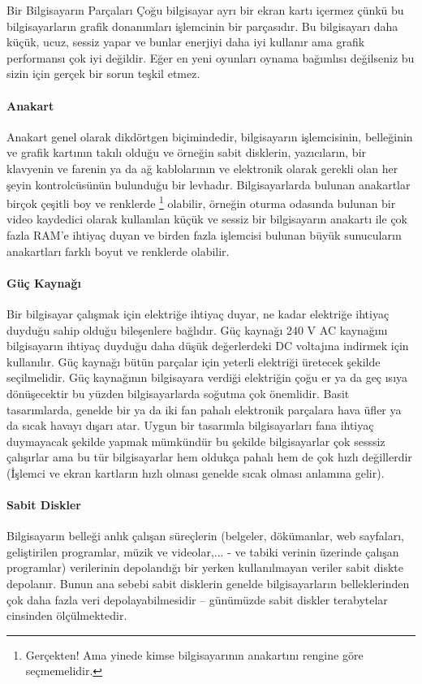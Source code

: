 \begin{section}{Bir Bilgisayarın Parçaları}
Çoğu bilgisayar ayrı bir ekran kartı içermez çünkü bu bilgisayarların grafik donanımları işlemcinin bir parçasıdır. Bu bilgisayarı daha küçük, ucuz, sessiz yapar ve bunlar enerjiyi daha iyi kullanır ama grafik performansı çok iyi değildir. Eğer en yeni oyunları oynama bağımlısı değilseniz bu sizin için gerçek bir sorun teşkil etmez.
\paragraph{Anakart}{Anakart genel olarak dikdörtgen biçimindedir, bilgisayarın işlemcisinin, belleğinin ve grafik kartının takılı olduğu ve örneğin sabit disklerin, yazıcıların, bir klavyenin ve farenin ya da ağ kablolarının ve elektronik olarak gerekli olan her şeyin kontrolcüsünün bulunduğu bir levhadır. Bilgisayarlarda bulunan anakartlar birçok çeşitli boy ve renklerde 
\footnote{Gerçekten! Ama yinede kimse bilgisayarının anakartını rengine göre seçmemelidir.}
olabilir, örneğin oturma odasında bulunan bir video kaydedici olarak kullanılan küçük ve sessiz bir bilgisayarın anakartı ile çok fazla RAM'e ihtiyaç duyan ve birden fazla işlemcisi bulunan büyük sunucuların anakartları farklı boyut ve renklerde olabilir.}
\paragraph{Güç Kaynağı}{Bir bilgisayar çalışmak için elektriğe ihtiyaç duyar, ne kadar elektriğe ihtiyaç duyduğu sahip olduğu bileşenlere bağlıdır. Güç kaynağı 240 V AC kaynağını bilgisayarın ihtiyaç duyduğu daha düşük değerlerdeki DC voltajına indirmek için kullanılır. Güç kaynağı bütün parçalar için yeterli elektriği üretecek şekilde seçilmelidir. Güç kaynağının bilgisayara verdiği elektriğin çoğu er ya da geç ısıya dönüşecektir bu yüzden bilgisayarlarda soğutma çok önemlidir. Basit tasarımlarda, genelde bir ya da iki fan pahalı elektronik parçalara hava üfler ya da sıcak havayı dışarı atar. Uygun bir tasarımla bilgisayarları fana ihtiyaç duymayacak şekilde yapmak mümkündür bu şekilde bilgisayarlar çok sesssiz çalışırlar ama bu tür bilgisayarlar hem oldukça pahalı hem de çok hızlı değillerdir (İşlemci ve ekran kartların hızlı olması genelde sıcak olması anlamına gelir).}
\paragraph{Sabit Diskler}{Bilgisayarın belleği anlık çalışan süreçlerin (belgeler, dökümanlar, web sayfaları, geliştirilen programlar, müzik ve videolar,... - ve tabiki verinin üzerinde çalışan programlar) verilerinin depolandığı bir yerken kullanılmayan veriler sabit diskte depolanır. Bunun ana sebebi sabit disklerin genelde bilgisayarların belleklerinden çok daha fazla veri depolayabilmesidir – günümüzde sabit diskler terabytelar cinsinden ölçülmektedir.}


\end{section}
